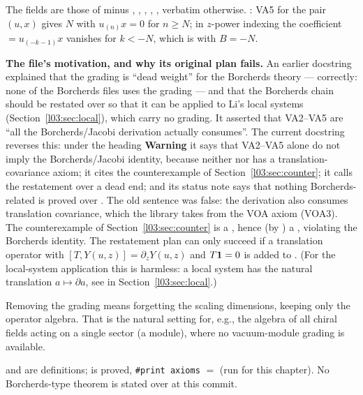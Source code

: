 \begin{dictionary}
The fields are those of  minus , ,
, , , verbatim otherwise. : VA5
for the pair $(u,x)$ gives $N$ with $u_{(n)}x = 0$ for $n\ge N$; in $z$-power indexing the
coefficient  $=u_{(-k-1)}x$ vanishes for $k<-N$, which is  with
$B = -N$.

\textbf{The file's motivation, and why its original plan fails.} An earlier docstring explained that the
grading is ``dead weight'' for the Borcherds theory --- correctly: none of the Borcherds files uses the
grading --- and that the Borcherds chain should be restated over  so that it can be
applied to Li's local systems (Section~\ref{l03:sec:local}), which carry no grading. It asserted
that VA2--VA5 are ``all the Borcherds/Jacobi derivation actually consumes''. The current docstring
reverses this: under the heading \textbf{Warning} it says that VA2--VA5 alone do not imply the
Borcherds/Jacobi identity, because neither  nor  has a
translation-covariance axiom; it cites the counterexample of Section~\ref{l03:sec:counter}; it calls the
restatement over  a dead end; and its status note says that nothing Borcherds-related is
proved over . The old sentence was
false: the derivation also consumes translation covariance, which the library takes from the VOA
axiom (VOA3). The counterexample of Section~\ref{l03:sec:counter} is a , hence
(by ) a , violating the Borcherds identity. The restatement plan can
only succeed if a translation operator with $[T,Y(u,z)] = \partial_zY(u,z)$ and $T\mathbf{1} = 0$
is added to . (For the local-system application this is harmless: a local system has
the natural translation $a\mapsto\partial a$, see  in
Section~\ref{l03:sec:local}.)
\end{dictionary}

\begin{physics}
Removing the grading means forgetting the scaling dimensions, keeping only the operator algebra.
That is the natural setting for, e.g., the algebra of all chiral fields acting on a single sector
(a module), where no vacuum-module grading is available.
\end{physics}

\begin{status}
 and  are definitions;  is proved,
\texttt{\#print axioms} $=$  (run for this
chapter). No Borcherds-type theorem is stated over  at this commit.
\end{status}

